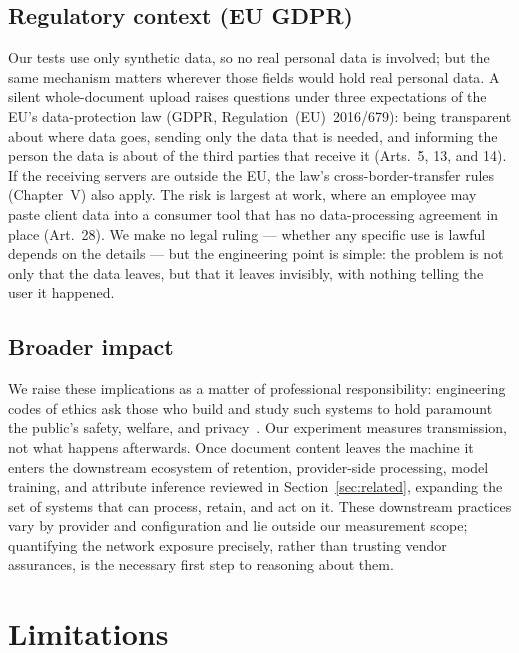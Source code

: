 \documentclass[10pt,conference,a4paper]{IEEEtran}
\begin{document}
\subsection{Regulatory context (EU GDPR)}
Our tests use only synthetic data, so no real personal data is involved; but the same
mechanism matters wherever those fields would hold real personal data. A silent
whole-document upload raises questions under three expectations of the EU's data-protection
law (GDPR, Regulation~(EU)~2016/679): being transparent about where data goes, sending only
the data that is needed, and informing the person the data is about of the third parties
that receive it (Arts.~5, 13, and 14). If the
receiving servers are outside the EU, the law's cross-border-transfer rules (Chapter~V) also
apply. The risk is largest at work, where an employee may paste client data into a consumer
tool that has no data-processing agreement in place (Art.~28). We make no legal ruling ---
whether any specific use is lawful depends on the details --- but the engineering point is
simple: the problem is not only that the data leaves, but that it leaves invisibly, with
nothing telling the user it happened.

\subsection{Broader impact}
We raise these implications as a matter of professional responsibility: engineering codes of
ethics ask those who build and study such systems to hold paramount the public's safety,
welfare, and privacy~\citep{ieee2020ethics}. Our experiment measures transmission, not what
happens afterwards. Once document content leaves the machine it enters the downstream
ecosystem of retention, provider-side processing, model training, and attribute inference
reviewed in Section~\ref{sec:related}, expanding the set of systems that can process,
retain, and act on it. These downstream practices vary by provider and configuration and lie
outside our measurement scope; quantifying the network exposure precisely, rather than
trusting vendor assurances, is the necessary first step to reasoning about them.

\section{Limitations}
\label{sec:limitations}
\end{document}
